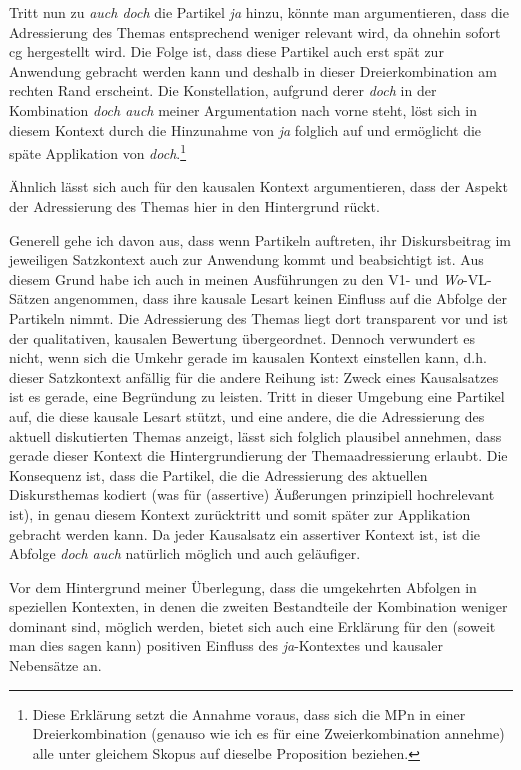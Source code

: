 Tritt nun zu \textit{auch doch} die Partikel \textit{ja} hinzu, könnte man argumentieren, dass die Adressierung des Themas entsprechend weniger relevant wird, da ohnehin sofort cg hergestellt wird. Die Folge ist, dass diese Partikel auch erst spät zur Anwendung gebracht werden kann und deshalb in dieser Dreierkombination am rechten Rand erscheint. Die Konstellation, aufgrund derer \textit{doch} in der Kombination \textit{doch auch} meiner Argumentation nach vorne steht, löst sich in diesem Kontext durch die Hinzunahme von \textit{ja} folglich auf und ermöglicht die späte Applikation von \textit{doch}.\footnote{Diese Erklärung setzt die Annahme voraus, dass sich die MPn in einer Dreierkombination (genauso wie ich es für eine Zweierkombination annehme) alle unter gleichem Skopus auf dieselbe Proposition beziehen.}

Ähnlich lässt sich auch für den kausalen Kontext argumentieren, dass der Aspekt der Adressierung des Themas hier in den Hintergrund rückt. 

Generell gehe ich davon aus, dass wenn Partikeln auftreten, ihr Diskursbeitrag im jeweiligen Satzkontext auch zur Anwendung kommt und beabsichtigt ist. Aus diesem Grund habe ich auch in meinen Ausführungen zu den V1- und \textit{Wo}-VL-Sätzen angenommen, dass ihre kausale Lesart keinen Einfluss auf die Abfolge der Partikeln nimmt. Die Adressierung des Themas liegt dort transparent vor und ist der qualitativen, kausalen Bewertung übergeordnet. Dennoch verwundert es nicht, wenn sich die Umkehr gerade im kausalen Kontext einstellen kann, d.h. dieser Satzkontext anfällig für die andere Reihung ist: Zweck eines Kausalsatzes ist es gerade, eine Begründung zu leisten. Tritt in dieser Umgebung eine Partikel auf, die diese kausale Lesart stützt, und eine andere, die die Adressierung des aktuell diskutierten Themas anzeigt, lässt sich folglich plausibel annehmen, dass gerade dieser Kontext die Hintergrundierung der Themaadressierung erlaubt. Die Konsequenz ist, dass die Partikel, die die Adressierung des aktuellen Diskursthemas kodiert (was für (assertive) Äußerungen prinzipiell hochrelevant ist), in genau diesem Kontext zurücktritt und somit später zur Applikation gebracht werden kann. Da jeder Kausalsatz ein assertiver Kontext ist, ist die Abfolge \textit{doch auch} natürlich möglich und auch geläufiger.

Vor dem Hintergrund meiner Überlegung, dass die umgekehrten Abfolgen in speziellen Kontexten, in denen die zweiten Bestandteile der Kombination weniger dominant sind, möglich werden, bietet sich auch eine Erklärung für den (soweit man dies sagen kann) positiven Einfluss des \textit{ja}-Kontextes und kausaler Nebensätze an.

